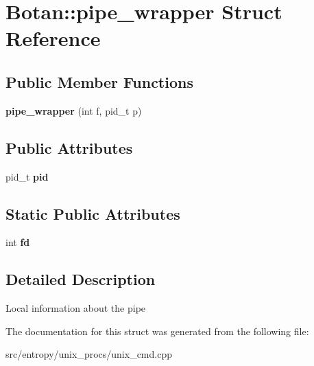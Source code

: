 \hypertarget{structBotan_1_1pipe__wrapper}{\section{Botan\-:\-:pipe\-\_\-wrapper Struct Reference}
\label{structBotan_1_1pipe__wrapper}
}
\subsection*{Public Member Functions}
\begin{DoxyCompactItemize}
\item 
\hypertarget{structBotan_1_1pipe__wrapper_ad0b2163e3b3ac877ca8ac4ca8ceb94bc}{{\bfseries pipe\-\_\-wrapper} (int f, pid\-\_\-t p)}\label{structBotan_1_1pipe__wrapper_ad0b2163e3b3ac877ca8ac4ca8ceb94bc}

\end{DoxyCompactItemize}
\subsection*{Public Attributes}
\begin{DoxyCompactItemize}
\item 
\hypertarget{structBotan_1_1pipe__wrapper_a51924e0f8879323629ca85f7c75fb763}{pid\-\_\-t {\bfseries pid}}\label{structBotan_1_1pipe__wrapper_a51924e0f8879323629ca85f7c75fb763}

\end{DoxyCompactItemize}
\subsection*{Static Public Attributes}
\begin{DoxyCompactItemize}
\item 
\hypertarget{structBotan_1_1pipe__wrapper_ad5ba05d3cee60bc71b0133e0431ff476}{int {\bfseries fd}}\label{structBotan_1_1pipe__wrapper_ad5ba05d3cee60bc71b0133e0431ff476}

\end{DoxyCompactItemize}


\subsection{Detailed Description}
Local information about the pipe 

The documentation for this struct was generated from the following file\-:\begin{DoxyCompactItemize}
\item 
src/entropy/unix\-\_\-procs/unix\-\_\-cmd.\-cpp\end{DoxyCompactItemize}
